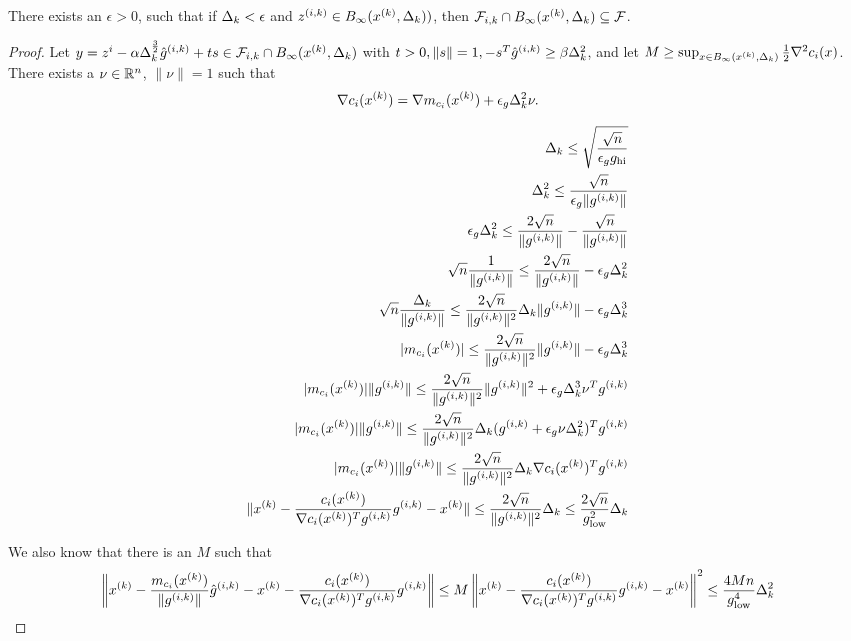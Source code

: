 \begin{theorem}
There exists an $\epsilon > 0$, such that if $\Delta_k < \epsilon$ and $z^{(i, k)} \in B_{\infty}({x^{(k)}}, \Delta_k))$,
then ${\mathcal F_{i, k}} \cap B_{\infty}({x^{(k)}}, \Delta_k) \subseteq {\mathcal F}$.

\end{theorem}

\begin{proof}
Let $y = z^i - \alpha \Delta_k^{\frac 3 2}{{\hat g}^{(i, k)}} + t s \in {\mathcal F_{i, k}} \cap B_{\infty}({x^{(k)}}, \Delta_k) $ with $t > 0, \|s\| = 1, -s^T{{\hat g}^{(i, k)}} \ge \beta \Delta_k^2$, and let $M \ge \sup_{x \in B_{\infty}({x^{(k)}}, \Delta_k)} \frac 1 2 \nabla^2 c_i(x)$.
There exists a $\nu \in {\mathbb R^{n}}$, $\|\nu\|=1$ such that 
\begin{align*}
\nabla c_i({x^{(k)}}) = \nabla m_{c_i}({x^{(k)}}) + \epsilon_{g}\Delta_k^2\nu.
\end{align*}


\begin{align*}
\Delta_k \le \sqrt{\frac{\sqrt{n}}{\epsilon_gg_{\text{hi}}}} \\
\Delta_k^2 \le \frac{\sqrt{n}}{\epsilon_g\|{g^{(i, k)}}\|} \\
\epsilon_g\Delta_k^2 \le \frac{2\sqrt{n}}{\|{g^{(i, k)}}\|} - \frac{\sqrt{n}}{\|{g^{(i, k)}}\|} \\
\sqrt{n}\frac{1}{\|{g^{(i, k)}}\|} \le \frac{2\sqrt{n}}{\|{g^{(i, k)}}\|}  - \epsilon_g\Delta_k^2 \\
\sqrt{n}\frac{\Delta_k}{\|{g^{(i, k)}}\|} \le \frac{2\sqrt{n}}{\|{g^{(i, k)}}\|^2}\Delta_k \|{g^{(i, k)}}\| - \epsilon_g\Delta_k^3 \\
|m_{c_i}({x^{(k)}})| \le \frac{2\sqrt{n}}{\|{g^{(i, k)}}\|^2} \|{g^{(i, k)}}\| - \epsilon_g\Delta_k^3 \\
|m_{c_i}({x^{(k)}})|\|{g^{(i, k)}}\| \le \frac{2\sqrt{n}}{\|{g^{(i, k)}}\|^2} \|{g^{(i, k)}}\|^2 + \epsilon_g\Delta_k^3\nu^T{g^{(i, k)}} \\
|m_{c_i}({x^{(k)}})|\|{g^{(i, k)}}\| \le \frac{2\sqrt{n}}{\|{g^{(i, k)}}\|^2} \Delta_k({g^{(i, k)}} + \epsilon_g\nu\Delta_k^2)^T {g^{(i, k)}}\\
|m_{c_i}({x^{(k)}})|\|{g^{(i, k)}}\| \le \frac{2\sqrt{n}}{\|{g^{(i, k)}}\|^2}\Delta_k \nabla c_i({x^{(k)}}) ^T {g^{(i, k)}}\\
\|{x^{(k)}} - \frac{c_i({x^{(k)}})}{\nabla c_i({x^{(k)}}) ^T {g^{(i, k)}}}{g^{(i, k)}}- {x^{(k)}}\| \le \frac{2\sqrt{n}}{\|{g^{(i, k)}}\|^2}\Delta_k  \le \frac{2\sqrt{n}}{g_{\text{low}}^2}\Delta_k \\
\end{align*}

We also know that there is an $M$ such that
\begin{align*}
\left\|{x^{(k)}} - \frac{m_{c_i}({x^{(k)}})}{\|{g^{(i, k)}}\|}{{\hat g}^{(i, k)}} - {x^{(k)}} - \frac{c_i({x^{(k)}})}{\nabla c_i({x^{(k)}}) ^T {g^{(i, k)}}}{g^{(i, k)}}\right\| \le M\left\|{x^{(k)}} - \frac{c_i({x^{(k)}})}{\nabla c_i({x^{(k)}}) ^T {g^{(i, k)}}}{g^{(i, k)}}- {x^{(k)}}\right\|^2
\le \frac{4Mn}{g_{\text{low}}^4}\Delta_k^2
\end{align*}




\end{proof}
